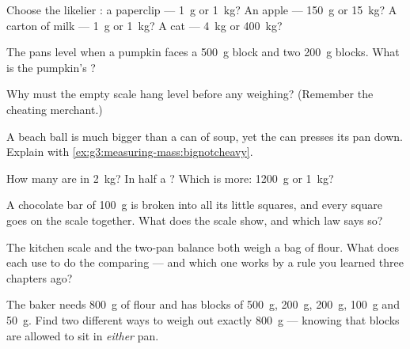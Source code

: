 \begin{exercise}[$\star$]\label{exo:g3:measuring-mass:2}
Choose the likelier : a paperclip --- \qty{1}{g} or \qty{1}{kg}?
An apple --- \qty{150}{g} or \qty{15}{kg}? A carton of milk ---
\qty{1}{g} or \qty{1}{kg}? A cat --- \qty{4}{kg} or \qty{400}{kg}?
\end{exercise}

\begin{exercise}[$\star$]\label{exo:g3:measuring-mass:3}
The pans level when a pumpkin faces a \qty{500}{g} block and two
\qty{200}{g} blocks. What is the pumpkin's ?
\end{exercise}

\begin{exercise}[$\star$]\label{exo:g3:measuring-mass:4}
Why must the empty scale hang level before any weighing? (Remember
the cheating merchant.)
\end{exercise}

\begin{exercise}[$\star$]\label{exo:g3:measuring-mass:5}
A beach ball is much bigger than a can of soup, yet the can presses
its pan down. Explain with
\cref{ex:g3:measuring-mass:bignotcheavy}.
\end{exercise}

\begin{exercise}[$\star$]\label{exo:g3:measuring-mass:6}
How many  are in \qty{2}{kg}? In half a ? Which is
more: \qty{1200}{g} or \qty{1}{kg}?
\end{exercise}

\begin{exercise}[$\star$]\label{exo:g3:measuring-mass:7}
A chocolate bar of \qty{100}{g} is broken into all its little
squares, and every square goes on the scale together. What 
does the scale show, and which law says so?
\end{exercise}

\begin{exercise}[$\star$]\label{exo:g3:measuring-mass:8}
The kitchen scale and the two-pan balance both weigh a bag of
flour. What does each use to do the comparing --- and which one
works by a rule you learned three chapters ago?
\end{exercise}

\begin{exercise}[$\star$]\label{exo:g3:measuring-mass:9}
The baker needs \qty{800}{g} of flour and has blocks of
\qty{500}{g}, \qty{200}{g}, \qty{200}{g}, \qty{100}{g} and
\qty{50}{g}. Find two different ways to weigh out exactly
\qty{800}{g} --- knowing that blocks are allowed to sit in
\emph{either} pan.
\end{exercise}

